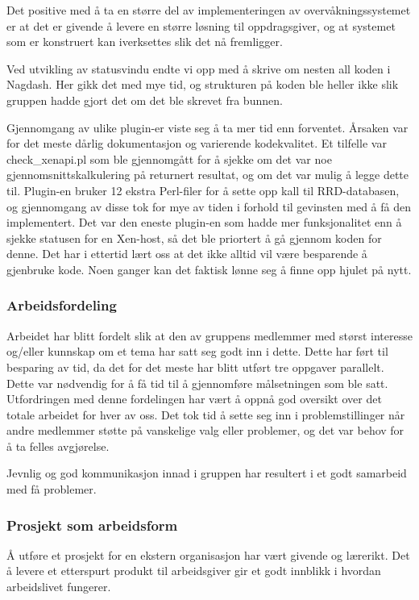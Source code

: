 Det positive med å ta en større del av implementeringen av overvåkningssystemet er at det er givende å levere en større løsning til oppdragsgiver, og at systemet som er konstruert kan iverksettes slik det nå fremligger.

Ved utvikling av statusvindu endte vi opp med å skrive om nesten all koden i Nagdash. Her gikk det med mye tid, og strukturen på koden ble heller ikke slik gruppen hadde gjort det om det ble skrevet fra bunnen. 

Gjennomgang av ulike plugin-er viste seg å ta mer tid enn forventet. Årsaken var for det meste dårlig dokumentasjon og varierende kodekvalitet. Et tilfelle var check\_xenapi.pl som ble gjennomgått for å sjekke om det var noe gjennomsnittskalkulering på returnert resultat, og om det var mulig å legge dette til. Plugin-en bruker 12 ekstra Perl-filer for å sette opp kall til RRD-databasen, og gjennomgang av disse tok for mye av tiden i forhold til gevinsten med å få den implementert. Det var den eneste plugin-en som hadde mer funksjonalitet enn å sjekke statusen for en Xen-host, så det ble priortert å gå gjennom koden for denne. 
Det har i ettertid lært oss at det ikke alltid vil være besparende å gjenbruke kode. Noen ganger kan det faktisk lønne seg å finne opp hjulet på nytt.

\subsubsection{Arbeidsfordeling}
Arbeidet har blitt fordelt slik at den av gruppens medlemmer med størst interesse og/eller kunnskap om et tema har satt seg godt inn i dette. Dette har ført til besparing av tid, da det for det meste har blitt utført tre oppgaver parallelt. Dette var nødvendig for å få tid til å gjennomføre målsetningen som ble satt. Utfordringen med denne fordelingen har vært å oppnå god oversikt over det totale arbeidet for hver av oss. Det tok tid å sette seg inn i problemstillinger når andre medlemmer støtte på vanskelige valg eller problemer, og det var behov for å ta felles avgjørelse.

Jevnlig og god kommunikasjon innad i gruppen har resultert i et godt samarbeid med få problemer. 

\subsubsection{Prosjekt som arbeidsform}
Å utføre et prosjekt for en ekstern organisasjon har vært givende og lærerikt. Det å levere et etterspurt produkt til arbeidsgiver gir et godt innblikk i hvordan arbeidslivet fungerer.

